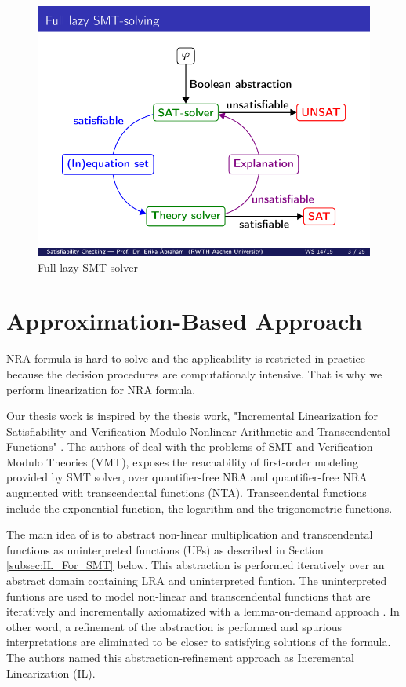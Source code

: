 \begin{figure}[ht!]
  \centering
  \includegraphics[width=0.8\linewidth]{./figures/FullLazySMT.pdf}
  \caption{Full lazy SMT solver \cite{brahm2010ALS}}
  \label{fig:FullLazySMT}
\end{figure}

\section{Approximation-Based Approach}
\label{sec:Approximation_Based_Approach}
NRA formula is hard to solve and the applicability is restricted in practice because the decision procedures are computationaly intensive.
That is why we perform linearization for NRA formula.\newline

\noindent Our thesis work is inspired by the thesis work, "Incremental Linearization for Satisfiability and Verification Modulo Nonlinear Arithmetic and Transcendental Functions" \cite{Cimatti:2018:ILS:3274693.3230639}.
The authors of \cite{Cimatti:2018:ILS:3274693.3230639} deal with the problems of SMT and Verification Modulo Theories (VMT), exposes the reachability of first-order modeling provided by SMT solver, over  quantifier-free NRA and quantifier-free NRA augmented with  transcendental functions (NTA).
Transcendental functions include the exponential function, the logarithm and the trigonometric functions.\newline

\noindent The main idea of \cite{Cimatti:2018:ILS:3274693.3230639} is to abstract non-linear multiplication and transcendental functions as uninterpreted functions (UFs) as described in Section \ref{subsec:IL_For_SMT} below.
This abstraction is performed iteratively over an abstract domain containing LRA and uninterpreted funtion.
The uninterpreted funtions are used to model non-linear and transcendental functions that are iteratively and incrementally axiomatized with a lemma-on-demand approach \cite{Cimatti:2018:ILS:3274693.3230639}.
In other word, a refinement of the abstraction is performed and spurious interpretations are eliminated to be closer to satisfying solutions of the formula.
The authors named this abstraction-refinement approach as Incremental Linearization (IL).\newline

